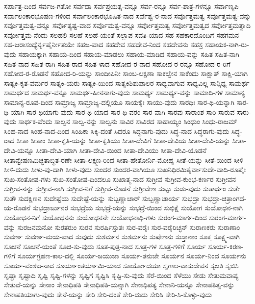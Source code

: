 {ಸರ್ಪಾತ್ರ-ದಿಂದ
ಸರ್ವಜ-ಗತೋ
ಸರ್ವದಾ
ಸರ್ವಪ್ರಯತ್ನ-ವನ್ನೂ
ಸರ್ವ-ರನ್ನೂ
ಸರ್ವ-ಶಾತ್ರ-ಗಳನ್ನೂ
ಸರ್ವಾಣ್ಯಪಿ
ಸರ್ವಾಲಂಕಾರಭೂಷಣ-ಗಳಿಂದ
ಸರ್ವಾಲಂಕಾರಭೂಷಿತ-ನಾದ
ಸರ್ವೆಶ್ವ-ರ-ನಾದ
ಸರ್ವೊತ್ತಮತ್ವ
ಸರ್ವೊತ್ತಮತ್ವ-ವನ್ನು
ಸರ್ವೊತ್ತಮತ್ವ-ವನ್ನೂ
ಸರ್ವೊತ್ಯಷ್ಟ-ವಾದ
ಸರ್ವೊಮತ್ವ-ವನ್ನೂ
ಸರ್ವೋತ್ತಮತ್ವ
ಸರ್ವೋತ್ತಮತ್ವದ
ಸರ್ವೋತ್ತಮತ್ವಾದಿ
ಸರ್ವೋತ್ತಮ-ನೆಂದು
ಸಲಹಲಿ
ಸಲಹೆ
ಸಲಹೆ-ಯಂತೆ
ಸಲ್ಲಾಪ
ಸವತಿ-ಯಾದ
ಸಹ
ಸಹಕಾರದೊಂದಿಗೆ
ಸಹಗಮನ
ಸಹ-ಜರಾಸಂಧ್ಯೆರ್ನೃಪೈರ್ನೀತಯೇ
ಸಹಜ-ವಾದ
ಸಹದೇವ
ಸಹದೇವ-ನಿಂದ
ಸಹದೇವನು
ಸಹಸ್ರ
ಸಹಾಯಕ-ನಾಗಿ-ರು-ವುದು
ಸಹಾಯಕ್ಕಾಗಿ
ಸಹಾಯ-ದಿಂದ
ಸಹಾಯ-ಮಾಡಲು
ಸಹಾಯ-ಮಾಡಿದ
ಸಹಾಯ-ವನ್ನು
ಸಹಿತ
ಸಹಿತ-ನಾಗಿ
ಸಹಿತ-ನಾದ
ಸಹಿತ-ರಾಗಿ
ಸಹಿತ-ರಾದ
ಸಹಿತ-ಳಾದ
ಸಹೋದ-ರ-ನಾದ
ಸಹೋದ-ರ-ರನ್ನೂ
ಸಹೋದ-ರ-ರಿಗೆ
ಸಹೋದ-ರ-ರೊಡನೆ
ಸಹೋದ-ರಿ-ಯನ್ನು
ಸಾಂದೀಪಿನೀ
ಸಾಂಬ-ಲಕ್ಷಣಾ
ಸಾಕಲ್ವೇನ
ಸಾಕೆಂದು
ಸಾಕ್ಷಾತ್
ಸಾಕ್ಷಿ-ಯಾಗಿ
ಸಾತ್ಯಕಿ-ಕೃತ-ವರ್ಮರ
ಸಾತ್ಯಕಿ-ಯರು
ಸಾತ್ಯಕಿ-ಯಿಂದ
ಸಾತ್ಯಕಿಶಿಶುಪಾಲರ
ಸಾಧ್ಯವಾಗುವ
ಸಾಧ್ಯವಿಲ್ಲ
ಸಾನ್ನಿಧ್ಯ
ಸಾಮರ್ಥ
ಸಾಮರ್ಥದ
ಸಾಮರ್ಥ-ವನ್ನೂ
ಸಾಮರ್ಥ-ಹೀನನಾಗು-ವುದು
ಸಾಮರ್ಥ್ಯ
ಸಾಮರ್ಥ್ಯ-ವನ್ನು
ಸಾಮಾದಿ-ಗಳ
ಸಾಮಾನ್ಯ
ಸಾಮಾನ್ಯ-ರೂಪ-ದಿಂದ
ಸಾಮ್ರಾಜ್ಯ
ಸಾಮ್ರಾಜ್ಯ-ದಲ್ಲಿಯೂ
ಸಾಯಕೈಃ
ಸಾಯು-ವುದು
ಸಾರಥಿಃ
ಸಾರ-ಥಿ-ಯನ್ನಾಗಿ
ಸಾರ-ಥಿ-ಯಾಗಿ
ಸಾರ-ಥಿಯಾಗು-ವುದು
ಸಾರ-ಥಿ-ಯಾದ
ಸಾರ-ಥಿ-ವರಂ
ಸಾರ-ವಾಗಿ
ಸಾರವು
ಸಾರಾಂಶ
ಸಾರಿ
ಸಾರುವ
ಸಾರು-ವುದು
ಸಾರ್ಥಕ-ವೆಂದು
ಸಾಲ್ವನ
ಸಾಲ್ವ-ನನ್ನು
ಸಾಲ್ವನು
ಸಾವಿರ
ಸಾವಿರದ
ಸಾಹಾಯ್ಯಂ
ಸಿಂಧುಂ
ಸಿಂಧು-ರಾಜಮ್
ಸಿಂಹ-ನಾದ
ಸಿಂಹ-ನಾದ-ದಿಂದ
ಸಿಂಹಿಕಾ
ಸಿಕ್ಕಿ-ದಂತೆ
ಸಿದರೂ
ಸಿದ್ಧನಾಗು-ವುದು
ಸಿದ್ಧ-ನಾದ
ಸಿದ್ಧರಾಗು-ವುದು
ಸಿದ್ಧ-ರಾದ
ಸೀತಾ
ಸೀತಾಂ
ಸೀತಾ-ಕೃತಿ-ಯನ್ನು
ಸೀತಾ-ಕೃತಿಯು
ಸೀತಾ-ದೇವಿಗೆ
ಸೀತಾ-ದೇವಿಯ
ಸೀತಾ-ದೇವಿ-ಯನ್ನು
ಸೀತಾ-ದೇವಿ-ಯನ್ನೂ
ಸೀತಾ-ದೇವಿ-ಯಾಗಿ
ಸೀತಾ-ದೇವಿ-ಯಿಂದ
ಸೀತಾ-ದೇವಿಯು
ಸೀತಾ-ದೇವಿ-ಯೊಡನೆ
ಸೀತಾನ್ವೇಷಣಮಿಚ್ಛತಾಬ್ಧಿತ-ರಣೇ
ಸೀತಾ-ಲಕ್ಷ್ಮಣ-ರಿಂದ
ಸೀತಾ-ಹೇತೋರ್ನಿ-ಮೋಹ್ಯ
ಸೀತೆ-ಯನ್ನು
ಸೀತೆ-ಯಿಂದ
ಸೀಳಿ
ಸೀಳಿ-ದುದು
ಸೀಳು-ವು-ದಾಗಿ
ಸೀಳು-ವುದು
ಸುಂದರ
ಸುಂದರ-ವಾಗಿಯೂ
ಸುಖನಿಧಿರಮಿತೈರ್ವಾಸುದೇ-ವಾದಿ-ರೂಪೈಃ
ಸುಖ-ಸಂತೋಷ-ಗಳು
ಸುಖ-ಸಂತೋಷ-ದಿಂದಲೂ
ಸುಖಾತ್ಮ-ನಾದ
ಸುಗ್ರೀವ
ಸುಗ್ರೀವ-ಕುಂಭ-ಕರ್ಣರ
ಸುಗ್ರೀವನ
ಸುಗ್ರೀವ-ನನ್ನು
ಸುಗ್ರೀವ-ನಾಗಿ
ಸುಗ್ರೀವ-ನಿಗೆ
ಸುಗ್ರೀವ-ನೊಡನೆ
ಸುಗ್ರೀವೇಣ
ಸುಟ್ಟು
ಸುಡು-ವುದು
ಸುತಾರ್ಥಂ
ಸುತೇ
ಸುತೌ
ಸುದಕ್ಷಿಣನ
ಸುದೇಷ್ಟೆಯ
ಸುದೇಷ್ಟೆ-ಯನ್ನು
ಸುಬ್ಬಣ್ಣಾಚಾರ್
ಸುಬ್ಬಣ್ಣಾಚಾರ್ಯ
ಸುಭದ್ರಾ
ಸುಭದ್ರಾ-ಚಿತ್ರಾಂಗದೆ-ಯ-ರೊಡನೆ
ಸುಭದ್ರಾರ್ಜುನರ
ಸುಭದ್ರೆಯ
ಸುಭದ್ರೆ-ಯನ್ನು
ಸುಭದ್ರೆ-ಯಿಂದ
ಸುಭಿಕ್ಷೆ
ಸುಯೋಗ
ಸುಯೋಧನ-ನಾಗಿ
ಸುಯೋಧನ-ನಿಗೆ
ಸುಯೋಧನನು
ಸುಯೋಧನನೇ
ಸುಯೋಧನಾಧಿ-ಗಳು
ಸುರಂಗ-ಮಾರ್ಗ-ದಿಂದ
ಸುರಂಗ-ಮಾರ್ಗ-ವನ್ನು
ಸುರಜನಮನೋ
ಸುರತರುಂ
ಸುರನ
ಸುರರ್ಷಿಸ್ತುತಃ
ಸುರ-ವರೈಃ
ಸುರ-ವರೈರಿಚ್ಛನ್
ಸುರಾಣಕರು
ಸುರಾಣಾಂ
ಸುವರ್ಣ
ಸುವರ್ಣ-ಮಯ-ವಾದ
ಸುವುದು
ಸುಶರ್ಮನ
ಸುಶರ್ಮನು
ಸುಷೇಣನು
ಸುಸ್ತಾನಾಂ
ಸೂಕ್ತ
ಸೂಕ್ಷ್ಮ-ವಾಗಿ
ಸೂಚನೆ
ಸೂಚನೆ-ಯಂತೆ
ಸೂಚಿ-ಸು-ವುದು
ಸೂತ-ಪುತ್ರ-ನಾದ
ಸೂತ್ರ-ಗಳ
ಸೂತ್ರ-ಗಳಿಗೆ
ಸೂರ್ಯ
ಸೂರ್ಯ-ಕಿರಣ-ಗಳಿಗೆ
ಸೂರ್ಯಗ್ರಹಣ-ಕಾಲ-ದಲ್ಲಿ
ಸೂರ್ಯ-ಜಯುಜಾ
ಸೂರ್ಯ-ತನುಜೇ
ಸೂರ್ಯನ
ಸೂರ್ಯ-ನಿಂದ
ಸೂರ್ಯನು
ಸೂರ್ಯ-ವಂಶಜ-ನಾದ
ಸೂರ್ಯಾಂತರ್ಯಾಮಿ-ಯಾದ
ಸೂರ್ಯೋದಯಾ
ಸೃಗಾಲ-ವಾಸುದೇವನ
ಸೃಜತಿ
ಸೃಜಿಸಿ
ಸೃಷ್ಟಾ
ಸೃಷ್ಟಾದಿ
ಸೃಷ್ಟಿ
ಸೃಷ್ಟಿ-ಗಳನ್ನು
ಸೃಷ್ಟಿಗೆ
ಸೃಷ್ಟಿಸಿ
ಸೃಷ್ಟಿ-ಸು-ವುದು
ಸೆರೆ-ಯಿಂದ
ಸೆಳೆಯು
ಸೇಡು
ಸೇತುಮವಾಪ್ಯ
ಸೇತುವೆ-ಯನ್ನು
ಸೇನಾಂ
ಸೇನಾಧಿಪತಿ
ಸೇನಾಧಿಪತಿ-ಯನ್ನಾಗಿ
ಸೇನಾಧಿಪತ್ಯ
ಸೇನಾನಿ-ಯನ್ನೂ
ಸೇನಾಪತಿತ್ವ-ವನ್ನು
ಸೇನಾಪತಿಯಾಗು-ವುದು
ಸೇನೆ-ಯನ್ನು
ಸೇರಿ
ಸೇರಿ-ದಂತೆ
ಸೇರಿ-ದುದು
ಸೇರಿಸಿ
ಸೇರಿ-ಸಿ-ಕೊಳ್ಳು-ವುದು
}
